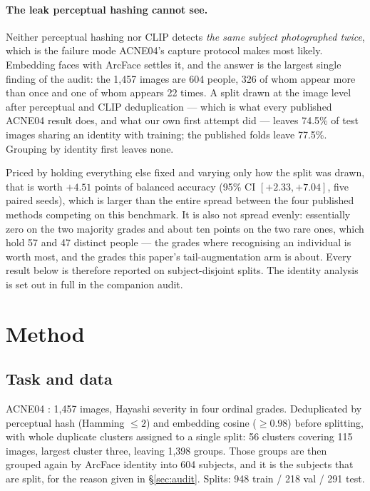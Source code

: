 \documentclass[11pt]{article}
\begin{document}
\paragraph{The leak perceptual hashing cannot see.} Neither perceptual hashing nor CLIP
detects \emph{the same subject photographed twice}, which is the failure mode ACNE04's
capture protocol makes most likely. Embedding faces with ArcFace settles it, and the
answer is the largest single finding of the audit: the 1{,}457 images are 604 people, 326
of whom appear more than once and one of whom appears 22 times. A split drawn at the image
level after perceptual and CLIP deduplication --- which is what every published ACNE04
result does, and what our own first attempt did --- leaves 74.5\% of test images sharing an
identity with training; the published folds leave 77.5\%. Grouping by identity first leaves
none.

Priced by holding everything else fixed and varying only how the split was drawn, that is
worth $+4.51$ points of balanced accuracy (95\% CI $[+2.33, +7.04]$, five paired seeds),
which is larger than the entire spread between the four published methods competing on this
benchmark. It is also not spread evenly: essentially zero on the two majority grades and
about ten points on the two rare ones, which hold 57 and 47 distinct people --- the grades
where recognising an individual is worth most, and the grades this paper's tail-augmentation
arm is about. Every result below is therefore reported on subject-disjoint splits. The
identity analysis is set out in full in the companion audit.

\section{Method}
\label{sec:method}

\subsection{Task and data}
ACNE04 \citep{wu2019}: 1{,}457 images, Hayashi severity in four ordinal grades.
Deduplicated by perceptual hash (Hamming $\leq 2$) and embedding cosine ($\geq 0.98$)
before splitting, with whole duplicate clusters assigned to a single split: 56 clusters
covering 115 images, largest cluster three, leaving 1{,}398 groups. Those groups are then
grouped again by ArcFace identity into 604 subjects, and it is the subjects that are split,
for the reason given in \S\ref{sec:audit}. Splits: 948 train / 218 val / 291 test.
\end{document}
